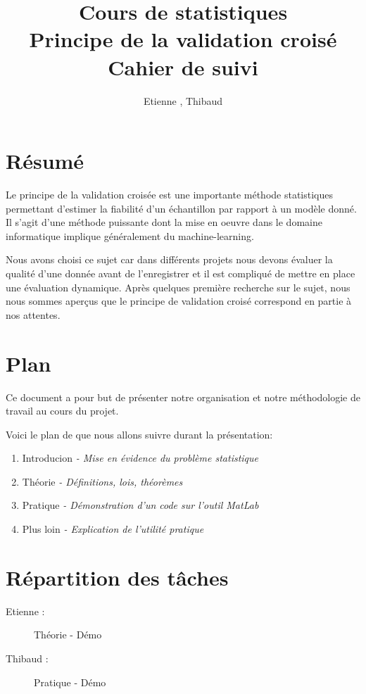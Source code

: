 \documentclass[a4paper, 12pt, french]{article}
\title{Cours de statistiques\\Principe de la validation croisé\\Cahier de suivi}
\author{Etienne \bsc{Batise}, Thibaud \bsc{Dauce}}
\begin{document}
   \maketitle 
   \section{Résumé} 
   Le principe de la validation croisée est une importante méthode statistiques permettant d'estimer la fiabilité d'un échantillon par rapport à un modèle donné. Il s'agit d'une méthode puissante dont la mise en oeuvre dans le domaine informatique implique généralement du machine-learning. 

   Nous avons choisi ce sujet car dans différents projets nous devons évaluer la qualité d'une donnée avant de l'enregistrer et il est compliqué de mettre en place une évaluation dynamique. Après quelques première recherche sur le sujet, nous nous sommes aperçus que le principe de validation croisé correspond en partie à nos attentes.

   \section{Plan} 
   Ce document a pour but de présenter notre organisation et notre méthodologie de travail au cours du projet. 

   Voici le plan de que nous allons suivre durant la présentation:
   \begin{enumerate}
       \item Introducion \textit{- Mise en évidence du problème statistique}
       \item Théorie \textit{- Définitions, lois, théorèmes}
       \item Pratique \textit{- Démonstration d'un code sur l'outil MatLab}
       \item Plus loin \textit{- Explication de l'utilité pratique}
   \end{enumerate}
   
   \section{Répartition des tâches}

   \begin{description}
       \item[Etienne : ]Théorie - Démo
       \item[Thibaud : ]Pratique - Démo
   \end{description}
\end{document}
